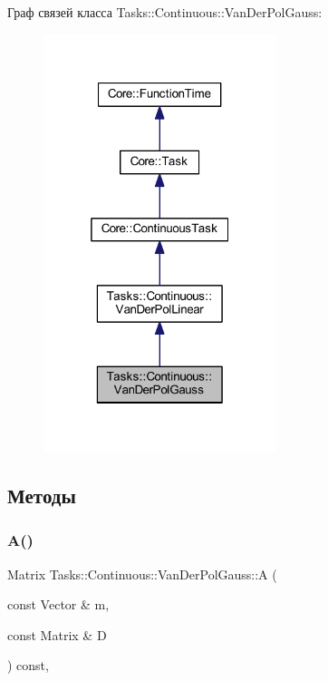 Граф связей класса Tasks\+:\+:Continuous\+:\+:Van\+Der\+Pol\+Gauss\+:\nopagebreak
\begin{figure}[H]
\begin{center}
\leavevmode
\includegraphics[width=193pt]{class_tasks_1_1_continuous_1_1_van_der_pol_gauss__coll__graph}
\end{center}
\end{figure}


\subsection{Методы}
\hypertarget{class_tasks_1_1_continuous_1_1_van_der_pol_gauss_a2ef625f7f8c590726c5b52e67622c172}{}\label{class_tasks_1_1_continuous_1_1_van_der_pol_gauss_a2ef625f7f8c590726c5b52e67622c172} 
\subsubsection{\texorpdfstring{A()}{A()}}
{\footnotesize\ttfamily Matrix Tasks\+::\+Continuous\+::\+Van\+Der\+Pol\+Gauss\+::A (\begin{DoxyParamCaption}\item[{const Vector \&}]{m,  }\item[{const Matrix \&}]{D }\end{DoxyParamCaption}) const\hspace{0.3cm}{\ttfamily [override]}, {\ttfamily [virtual]}}




